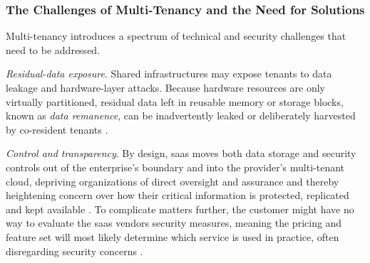 \documentclass[11pt, a4paper, oneside, listof=totoc]{scrartcl}
\begin{document}
            \subsubsection{The Challenges of Multi-Tenancy and the Need for Solutions}\label{subsubsec:challenges}
                Multi-tenancy introduces a spectrum of technical and security challenges that need
                to be addressed.

                \begin{enumerate}[label={[\arabic*]:},
                    ref=Challenge~\arabic*,
                    leftmargin=*,
                    itemsep=0.6\baselineskip]

                    \item\label{chal:remanence}
                        \textit{Residual-data exposure}.
                        Shared infrastructures may expose tenants to data leakage and hardware-layer
                        attacks. 
                        Because hardware resources are only virtually partitioned,
                        residual data left in reusable memory or storage blocks,
                        known as \textit{data remanence},
                        can be inadvertently leaked or deliberately harvested by co-resident tenants
                        \parencites[p.~586]{zissis2012}[pp.~344--345]{aljahdali2014}.

                    \item\label{chal:transparency}
                        \textit{Control and transparency}.
                        By design, \gls{saas} moves both data storage and security controls out of
                        the enterprise's boundary and into the provider's multi-tenant cloud,
                        depriving organizations of direct oversight and assurance and thereby
                        heightening concern over how their critical information is protected,
                        replicated and kept available \parencite[pp.~3--4]{subashini2011}.
                        To complicate matters further, the customer might have no way to evaluate
                        the \gls{saas} vendors security measures, meaning the pricing and feature
                        set will most likely determine which service is used in practice, often
                        disregarding security concerns
                        \parencites[p.~6]{everett2009}[p.~836]{khorshed2012}.


\end{enumerate}
\end{document}
